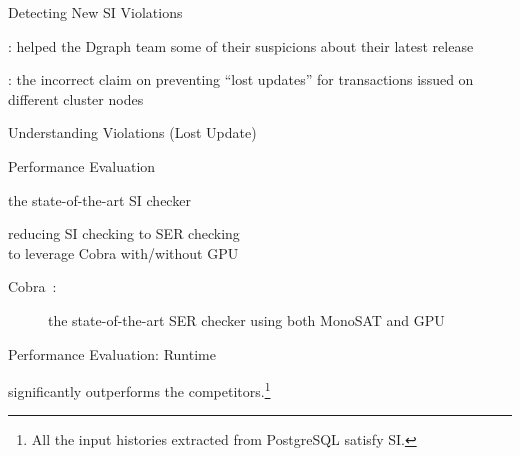 \begin{frame}{Detecting New SI Violations}
	\begin{center}
		: helped the Dgraph team  some of their suspicions
		  about their latest release

		\vspace{0.50cm}
		{}
		\vspace{0.50cm}

		:  the incorrect claim on preventing ``lost updates''
		  for transactions issued on different cluster nodes
	\end{center}
\end{frame}

\begin{frame}{Understanding Violations (Lost Update)}
	\begin{center}
		
	\end{center}
\end{frame}

\begin{frame}{Performance Evaluation}
	\begin{description}
		\setlength{\itemsep}{15pt}
		\item[dbcop~\ncite{Complexity:OOPSLA2019}:]
			the state-of-the-art SI checker
		\item[CobraSI:] reducing SI checking to SER checking \\
		   to leverage Cobra with/without GPU
			\vspace{0.20cm}
			\begin{description}
				\item[Cobra~:]
					the state-of-the-art SER checker using both MonoSAT and GPU
			\end{description}
	\end{description}
\end{frame}

\begin{frame}{Performance Evaluation: Runtime}
	\centerline{\polysi{} significantly outperforms the competitors.\footnote{
		All the input histories extracted from PostgreSQL satisfy SI.
	}}

\end{frame}

